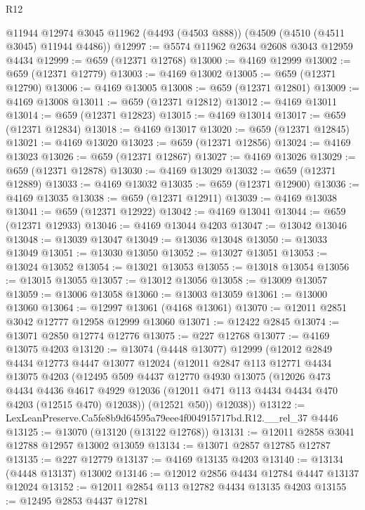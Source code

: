 \begin{lexlean}{R12}
\begin{coremodule}
    @11944
    @12974
    @3045
    @11962
    (@4493 (@4503 @888))
    (@4509 (@4510 (@4511 @3045) @11944 @4486))
@12997 := @5574 @11962 @2634 @2608 @3043 @12959 @4434
@12999 := @659 (@12371 @12768)
@13000 := @4169 @12999
@13002 := @659 (@12371 @12779)
@13003 := @4169 @13002
@13005 := @659 (@12371 @12790)
@13006 := @4169 @13005
@13008 := @659 (@12371 @12801)
@13009 := @4169 @13008
@13011 := @659 (@12371 @12812)
@13012 := @4169 @13011
@13014 := @659 (@12371 @12823)
@13015 := @4169 @13014
@13017 := @659 (@12371 @12834)
@13018 := @4169 @13017
@13020 := @659 (@12371 @12845)
@13021 := @4169 @13020
@13023 := @659 (@12371 @12856)
@13024 := @4169 @13023
@13026 := @659 (@12371 @12867)
@13027 := @4169 @13026
@13029 := @659 (@12371 @12878)
@13030 := @4169 @13029
@13032 := @659 (@12371 @12889)
@13033 := @4169 @13032
@13035 := @659 (@12371 @12900)
@13036 := @4169 @13035
@13038 := @659 (@12371 @12911)
@13039 := @4169 @13038
@13041 := @659 (@12371 @12922)
@13042 := @4169 @13041
@13044 := @659 (@12371 @12933)
@13046 := @4169 @13044 @4203
@13047 := @13042 @13046
@13048 := @13039 @13047
@13049 := @13036 @13048
@13050 := @13033 @13049
@13051 := @13030 @13050
@13052 := @13027 @13051
@13053 := @13024 @13052
@13054 := @13021 @13053
@13055 := @13018 @13054
@13056 := @13015 @13055
@13057 := @13012 @13056
@13058 := @13009 @13057
@13059 := @13006 @13058
@13060 := @13003 @13059
@13061 := @13000 @13060
@13064 := @12997 @13061 (@4168 @13061)
@13070 := @12011 @2851 @3042 @12777 @12958 @12999 @13060
@13071 := @12422 @2845
@13074 := @13071 @2850 @12774 @12776
@13075 := @227 @12768
@13077 := @4169 @13075 @4203
@13120 := @13074
    (@4448 @13077)
    @12999
    (@12012
      @2849
      @4434
      @12773
      @4447
      @13077
      @12024
      (@12011
        @2847
        @113
        @12771
        @4434
        @13075
        @4203
        (@12495
          @509
          @4437
          @12770
          @4930
          @13075
          (@12026
            @473
            @4434
            @4436
            @4617
            @4929
            @12036
            (@12011 @471 @113 @4434 @4434 @470 @4203 (@12515 @470) @12038))
          (@12521 @50))
        @12038))
@13122 := LexLeanPreserve.Ca5fe8b9d64595a79eee4f004915717bd.R12.__rel_37 @4446
@13125 := @13070 (@13120 (@13122 @12768))
@13131 := @12011 @2858 @3041 @12788 @12957 @13002 @13059
@13134 := @13071 @2857 @12785 @12787
@13135 := @227 @12779
@13137 := @4169 @13135 @4203
@13140 := @13134 (@4448 @13137) @13002
@13146 := @12012 @2856 @4434 @12784 @4447 @13137 @12024
@13152 := @12011 @2854 @113 @12782 @4434 @13135 @4203
@13155 := @12495 @2853 @4437 @12781

\end{coremodule}
\end{lexlean}
